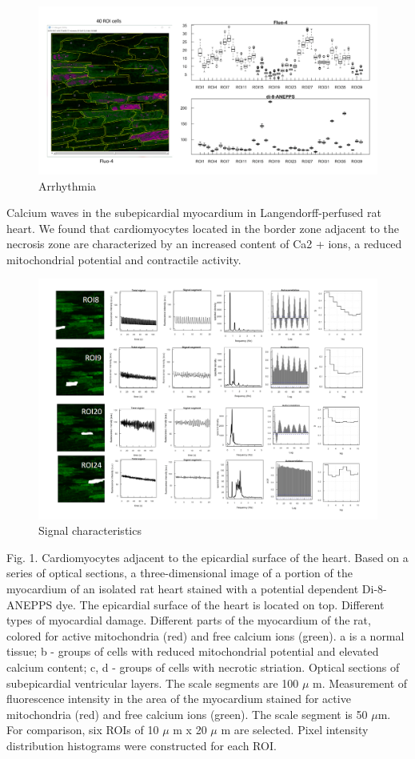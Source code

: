 \documentclass[a4paper,12pt]{article}
\begin{document}
\begin{figure}
    \includegraphics[width=\linewidth]{fig3.png}
    \caption{Arrhythmia}
    \label{fig:fig3}
\end{figure}

Calcium waves in the subepicardial myocardium in Langendorff-perfused rat heart.
We found that cardiomyocytes located in the border zone adjacent to the necrosis zone are characterized by an increased content of Ca2 + ions, a reduced mitochondrial potential and contractile activity.

\begin{figure}
    \includegraphics[width=\linewidth]{fig4.png}
    \caption{Signal characteristics}
    \label{fig:fig4}
\end{figure}

Fig. 1. Cardiomyocytes adjacent to the epicardial surface of the heart. Based on a series of optical sections, a three-dimensional image of a portion of the myocardium of an isolated rat heart stained with a potential dependent Di-8-ANEPPS dye. The epicardial surface of the heart is located on top. Different types of myocardial damage. Different parts of the myocardium of the rat, colored for active mitochondria (red) and free calcium ions (green). a is a normal tissue; b - groups of cells with reduced mitochondrial potential and elevated calcium content; c, d - groups of cells with necrotic striation. Optical sections of subepicardial ventricular layers. The scale segments are 100 $\mu$ m. Measurement of fluorescence intensity in the area of the myocardium stained for active mitochondria (red) and free calcium ions (green). The scale segment is 50 $\mu$m. For comparison, six ROIs of 10 $\mu$ m x 20 $\mu$ m are selected. Pixel intensity distribution histograms were constructed for each ROI.
\end{document}

